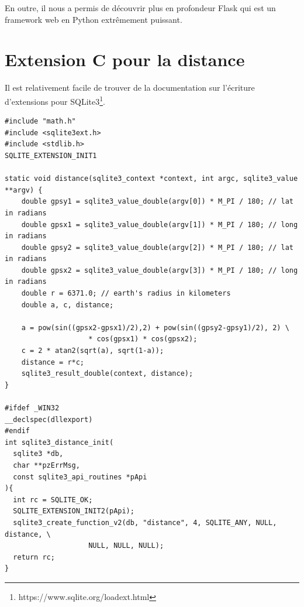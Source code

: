 \documentclass[a4paper]{article}
\begin{document}
En outre, il nous a permis de découvrir plus en profondeur Flask qui est un framework web en Python extrêmement puissant.

\appendix
\section{Extension C pour la distance}
\label{extension-c}
Il est relativement facile de trouver de la documentation sur l'écriture d'extensions pour SQLite3\footnote{https://www.sqlite.org/loadext.html}.

\begin{verbatim}
#include "math.h"
#include <sqlite3ext.h>
#include <stdlib.h> 
SQLITE_EXTENSION_INIT1

static void distance(sqlite3_context *context, int argc, sqlite3_value **argv) {
    double gpsy1 = sqlite3_value_double(argv[0]) * M_PI / 180; // lat in radians
    double gpsx1 = sqlite3_value_double(argv[1]) * M_PI / 180; // long in radians
    double gpsy2 = sqlite3_value_double(argv[2]) * M_PI / 180; // lat in radians
    double gpsx2 = sqlite3_value_double(argv[3]) * M_PI / 180; // long in radians
    double r = 6371.0; // earth's radius in kilometers
    double a, c, distance;

    a = pow(sin((gpsx2-gpsx1)/2),2) + pow(sin((gpsy2-gpsy1)/2), 2) \ 
    				* cos(gpsx1) * cos(gpsx2);
    c = 2 * atan2(sqrt(a), sqrt(1-a));
    distance = r*c;
    sqlite3_result_double(context, distance);
}

#ifdef _WIN32
__declspec(dllexport)
#endif
int sqlite3_distance_init(
  sqlite3 *db, 
  char **pzErrMsg, 
  const sqlite3_api_routines *pApi
){
  int rc = SQLITE_OK;
  SQLITE_EXTENSION_INIT2(pApi);
  sqlite3_create_function_v2(db, "distance", 4, SQLITE_ANY, NULL, distance, \
  					NULL, NULL, NULL);
  return rc;
}
\end{verbatim}
\end{document}
